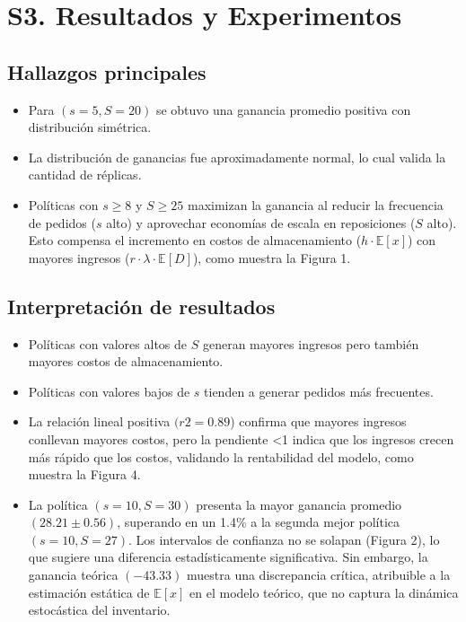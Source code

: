 \documentclass{report}
\begin{document}
\section*{S3. Resultados y Experimentos}

\subsection*{Hallazgos principales}

\begin{itemize}
\item Para \((s=5, S=20)\) se obtuvo una ganancia promedio positiva con distribución simétrica.
\item La distribución de ganancias fue aproximadamente normal, lo cual valida la cantidad de 
réplicas.
\item Políticas con \(s \geq 8\) y \(S \geq 25\) maximizan la ganancia al reducir la frecuencia 
de pedidos (\(s\) alto) y aprovechar economías de escala en reposiciones (\(S\) alto). Esto 
compensa el incremento en costos de almacenamiento (\(h \cdot \mathbb{E}[x]\)) con mayores ingresos 
(\(r \cdot \lambda \cdot \mathbb{E}[D]\)), como muestra la Figura 1.
\end{itemize}

\subsection*{Interpretación de resultados}

\begin{itemize}
\item Políticas con valores altos de \(S\) generan mayores ingresos pero también mayores 
costos de almacenamiento.
\item Políticas con valores bajos de \(s\) tienden a generar pedidos más frecuentes.
\item La relación lineal positiva \((r2=0.89\)) confirma que mayores ingresos conllevan mayores 
costos, pero la pendiente <1 indica que los ingresos crecen más rápido que los costos, 
validando la rentabilidad del modelo, como muestra la Figura 4.
\item La política \((s=10,S=30)\) presenta la mayor ganancia promedio \((28.21\pm 0.56)\), superando en un 
1.4\% a la segunda mejor política \((s=10,S=27)\). Los intervalos de confianza no se solapan (Figura 2), 
lo que sugiere una diferencia estadísticamente significativa. Sin embargo, la ganancia teórica 
\((-43.33)\) muestra una discrepancia crítica, atribuible a la estimación estática de \(\mathbb{E}[x]\) en el modelo 
teórico, que no captura la dinámica estocástica del inventario.
\end{itemize}
\end{document}
